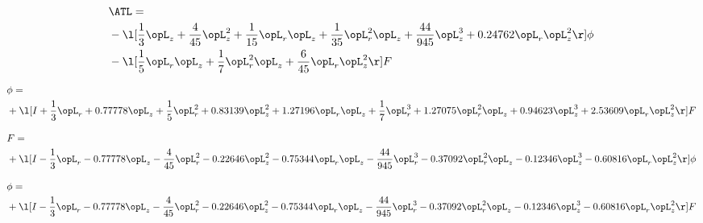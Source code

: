 \begin{alignat}{2} 
\label{eq:isoATL_1} 
& \ATL = \\ 
& - \l[ \frac{1}{3} \opL_z + \frac{4}{45} \opL_z^{2} + \frac{1}{15} \opL_r \opL_z + \frac{1}{35} \opL_r^{2} \opL_z + \frac{44}{945} \opL_z^{3} +  0.24762 \opL_r \opL_z^{2}  \r] \phi \nonumber \\ 
& - \l[ \frac{1}{5} \opL_r \opL_z + \frac{1}{7} \opL_r^{2} \opL_z + \frac{6}{45} \opL_r \opL_z^{2}  \r] F \nonumber \\ 
\end{alignat} 


\begin{alignat}{2} 
\label{eq:scalarFlux_4} 
& \phi = \\ 
& + \l[ I + \frac{1}{3} \opL_r +  0.77778 \opL_z + \frac{1}{5} \opL_r^{2} +  0.83139 \opL_z^{2} +  1.27196 \opL_r \opL_z + \frac{1}{7} \opL_r^{3} +  1.27075 \opL_r^{2} \opL_z +  0.94623 \opL_z^{3} +  2.53609 \opL_r \opL_z^{2}  \r] F \nonumber \\ 
\end{alignat} 


\begin{alignat}{2} 
\label{eq:transport3D_0} 
& F = \\ 
& + \l[ I - \frac{1}{3} \opL_r   -0.77778 \opL_z - \frac{4}{45} \opL_r^{2}   -0.22646 \opL_z^{2}   -0.75344 \opL_r \opL_z - \frac{44}{945} \opL_r^{3}   -0.37092 \opL_r^{2} \opL_z   -0.12346 \opL_z^{3}   -0.60816 \opL_r \opL_z^{2}  \r] \phi \nonumber \\ 
\end{alignat} 


\begin{alignat}{2} 
\label{eq:scalarFlux_5} 
& \phi = \\ 
& + \l[ I - \frac{1}{3} \opL_r   -0.77778 \opL_z - \frac{4}{45} \opL_r^{2}   -0.22646 \opL_z^{2}   -0.75344 \opL_r \opL_z - \frac{44}{945} \opL_r^{3}   -0.37092 \opL_r^{2} \opL_z   -0.12346 \opL_z^{3}   -0.60816 \opL_r \opL_z^{2}  \r] F \nonumber \\ 
\end{alignat} 


